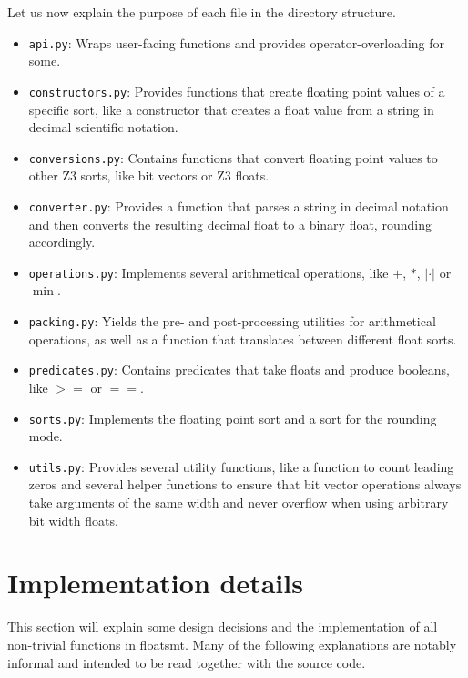 \documentclass[a4paper,UKenglish,cleveref, autoref, thm-restate]{lipics-v2019}
\begin{document}
Let us now explain the purpose of each file in the directory structure.
\begin{itemize}
	\item \verb|api.py|: Wraps user-facing functions and provides operator-overloading for some.
	\item \verb|constructors.py|: Provides functions that create floating point values of a specific sort, like a constructor that creates a float value from a string in decimal scientific notation.
	\item \verb|conversions.py|: Contains functions that convert floating point values to other Z3 sorts, like bit vectors or Z3 floats.
	\item \verb|converter.py|: Provides a function that parses a string in decimal notation and then converts the resulting decimal float to a binary float, rounding accordingly.
	\item \verb|operations.py|: Implements several arithmetical operations, like $+$, $*$, $|\cdot|$ or $\min$.
	\item \verb|packing.py|: Yields the pre- and post-processing utilities for arithmetical operations, as well as a function that translates between different float sorts.
	\item \verb|predicates.py|: Contains predicates that take floats and produce booleans, like $>=$ or $==$.
	\item \verb|sorts.py|: Implements the floating point sort and a sort for the rounding mode.
	\item \verb|utils.py|: Provides several utility functions, like a function to count leading zeros and several helper functions to ensure that bit vector operations always take arguments of the same width and never overflow when using arbitrary bit width floats.
\end{itemize}


\section{Implementation details}
This section will explain some design decisions and the implementation of all non-trivial functions in floatsmt. Many of the following explanations are notably informal and intended to be read together with the source code.
\end{document}
